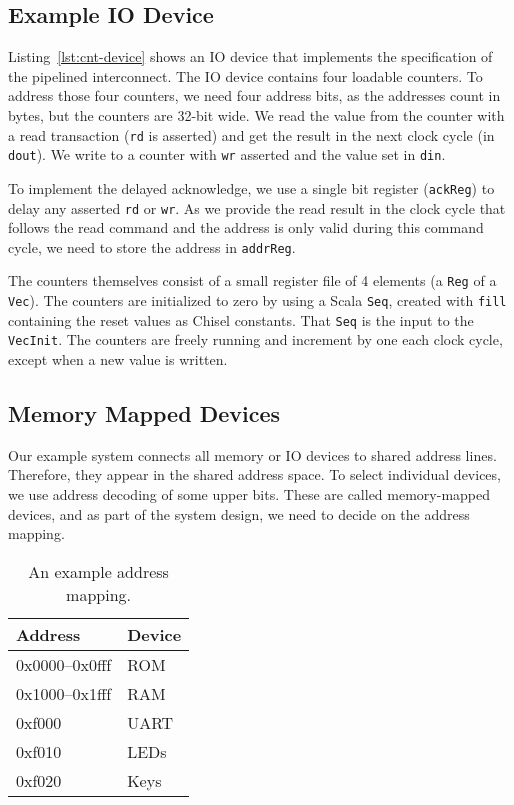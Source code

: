 \documentclass[%
    10pt,
    headinclude, footexclude,
    openright, %
    notitlepage,
    cleardoubleempty,
    headsepline,
    pointlessnumbers,
    bibtotoc, idxtotoc,
    ]{scrbook}
\newcommand{\code}[1]{{\lstinline[basicstyle=\small\ttfamily]{#1}}}
\begin{document}
\subsection{Example IO Device}


Listing~\ref{lst:cnt-device} shows an IO device that implements the specification of the
pipelined interconnect. The IO device contains four loadable counters. To address those four
counters, we need four address bits, as the addresses count in bytes, but the counters
are 32-bit wide. We read the value from the counter with a read transaction
(\code{rd} is asserted) and get the result in the next clock cycle (in \code{dout}). We write to a counter with
\code{wr} asserted and the value set in \code{din}.

To implement the delayed acknowledge, we use a single bit register (\code{ackReg}) to
delay any asserted \code{rd} or \code{wr}. As we provide the read result in
the clock cycle that follows the read command and the address is only valid during this
command cycle, we need to store the address in \code{addrReg}.

The counters themselves consist of a small register file of 4 elements (a \code{Reg} of a \code{Vec}).
The counters are initialized to zero by using a Scala \code{Seq}, created with \code{fill}
containing the reset values as Chisel constants. That \code{Seq} is the input to the \code{VecInit}.
The counters are freely running and increment by one each clock cycle, except when 
a new value is written.

\subsection{Memory Mapped Devices}

Our example system connects all memory or IO devices to shared
address lines. Therefore, they appear in the shared address space. To select individual
devices, we use address decoding of some upper bits. These are called memory-mapped devices,
and as part of the system design, we need to decide on the address mapping.

\begin{table}
\centering
\begin{tabular}{ll}
\toprule
Address & Device \\
\midrule
0x0000--0x0fff & ROM \\
0x1000--0x1fff & RAM \\
0xf000 & UART \\
0xf010 & LEDs \\
0xf020 & Keys \\
\bottomrule
\end{tabular}
\caption{An example address mapping.}
\label{tab:addr:map}
\end{table}
\end{document}
